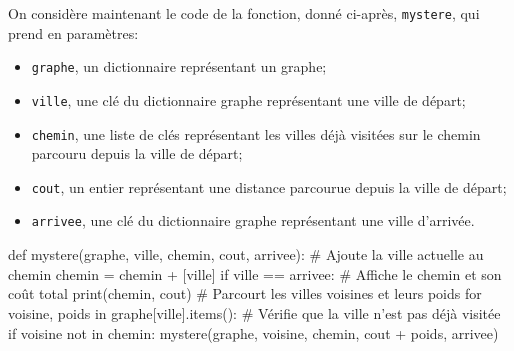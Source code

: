On considère maintenant le code de la fonction, donné ci-après, \texttt{mystere}, qui prend en paramètres:

\begin{itemize}
    \item \texttt{graphe}, un dictionnaire représentant un graphe;
    \item \texttt{ville}, une clé du dictionnaire graphe représentant une ville de départ;
    \item \texttt{chemin}, une liste de clés représentant les villes déjà visitées sur le chemin parcouru depuis la ville de départ;
    \item \texttt{cout}, un entier représentant une distance parcourue depuis la ville de départ;
    \item \texttt{arrivee}, une clé du dictionnaire graphe représentant une ville d'arrivée.
\end{itemize}

\begin{CodePythontexAlt}[TaillePolice=\large, Largeur=1\linewidth,Centre,Lignes=true,PremLigne=1]{}
def mystere(graphe, ville, chemin, cout, arrivee):
    # Ajoute la ville actuelle au chemin 
    chemin = chemin + [ville]
    if ville == arrivee:
        # Affiche le chemin et son coût total 
        print(chemin, cout) 
    # Parcourt les villes voisines et leurs poids 
    for voisine, poids in graphe[ville].items():
        # Vérifie que la ville n'est pas déjà visitée 
        if voisine not in chemin: 
            mystere(graphe, voisine, chemin, cout + poids, arrivee)
        \end{CodePythontexAlt}

